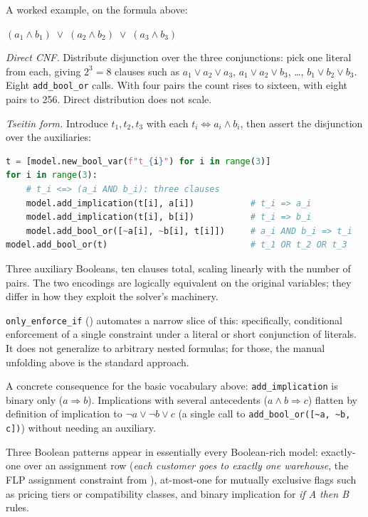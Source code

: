 A worked example, on the formula above:

\((a_1 \land b_1) \;\lor\; (a_2 \land b_2) \;\lor\; (a_3 \land b_3)\)

\emph{Direct CNF.} Distribute disjunction over the three conjunctions:
pick one literal from each, giving \(2^3 = 8\) clauses such as
\(a_1 \lor a_2 \lor a_3\), \(a_1 \lor a_2 \lor b_3\), \ldots,
\(b_1 \lor b_2 \lor b_3\). Eight \lstinline!add_bool_or!
calls. With four pairs the count rises to sixteen, with eight pairs to
256. Direct distribution does not scale.

\emph{Tseitin form.} Introduce \(t_1, t_2, t_3\) with each
\(t_i \Leftrightarrow a_i \land b_i\), then assert the disjunction over
the auxiliaries:

\begin{lstlisting}[language=Python]
t = [model.new_bool_var(f"t_{i}") for i in range(3)]
for i in range(3):
    # t_i <=> (a_i AND b_i): three clauses
    model.add_implication(t[i], a[i])           # t_i => a_i
    model.add_implication(t[i], b[i])           # t_i => b_i
    model.add_bool_or([~a[i], ~b[i], t[i]])     # a_i AND b_i => t_i
model.add_bool_or(t)                            # t_1 OR t_2 OR t_3
\end{lstlisting}

Three auxiliary Booleans, ten clauses total, scaling linearly with the
number of pairs. The two encodings are logically equivalent on the
original variables; they differ in how they exploit the solver's
machinery.

\lstinline!only_enforce_if! () automates a narrow
slice of this: specifically, conditional enforcement of a single
constraint under a literal or short conjunction of literals. It does not
generalize to arbitrary nested formulas; for those, the manual unfolding
above is the standard approach.

A concrete consequence for the basic vocabulary above:
\lstinline!add_implication! is binary only
(\(a \Rightarrow b\)). Implications with several antecedents
(\(a \land b \Rightarrow c\)) flatten by definition of implication to
\(\lnot a \lor \lnot b \lor c\) (a single call to
\lstinline!add_bool_or([~a, ~b, c])!) without
needing an auxiliary.

Three Boolean patterns appear in essentially every Boolean-rich model:
exactly-one over an assignment row (\emph{each customer goes to
exactly one warehouse}, the FLP assignment constraint from ),
at-most-one for mutually exclusive flags such as pricing tiers or
compatibility classes, and binary implication for \emph{if A then B}
rules.

